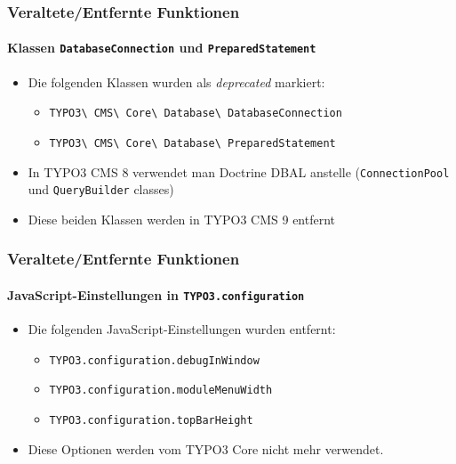 \begin{frame}[fragile]
	\frametitle{Veraltete/Entfernte Funktionen}
	\framesubtitle{Klassen \texttt{DatabaseConnection} und \texttt{PreparedStatement}}

	\begin{itemize}
		\item Die folgenden Klassen wurden als \textit{deprecated} markiert:
			\begin{itemize}
				\item \texttt{TYPO3\textbackslash
						CMS\textbackslash
						Core\textbackslash
						Database\textbackslash
						DatabaseConnection}
				\item \texttt{TYPO3\textbackslash
						CMS\textbackslash
						Core\textbackslash
						Database\textbackslash
						PreparedStatement}
			\end{itemize}
		\item In TYPO3 CMS 8 verwendet man Doctrine DBAL anstelle\newline
				(\texttt{ConnectionPool} und \texttt{QueryBuilder} classes)
		\item Diese beiden Klassen werden in TYPO3 CMS 9 entfernt
	\end{itemize}

\end{frame}


\begin{frame}[fragile]
	\frametitle{Veraltete/Entfernte Funktionen}
	\framesubtitle{JavaScript-Einstellungen in \texttt{TYPO3.configuration}}

	\begin{itemize}
		\item Die folgenden JavaScript-Einstellungen wurden entfernt:

		\begin{itemize}
			\item \texttt{TYPO3.configuration.debugInWindow}
			\item \texttt{TYPO3.configuration.moduleMenuWidth}
			\item \texttt{TYPO3.configuration.topBarHeight}
		\end{itemize}

		\item Diese Optionen werden vom TYPO3 Core nicht mehr verwendet.
	\end{itemize}

\end{frame}


